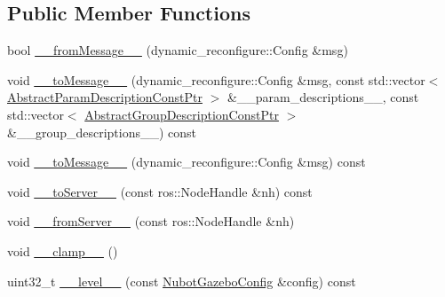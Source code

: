 \subsection*{Public Member Functions}
\begin{DoxyCompactItemize}
\item 
bool \hyperlink{classnubot__gazebo_1_1NubotGazeboConfig_a6c9c83ece7b76c7d538df8dc5e69c62c}{\-\_\-\-\_\-from\-Message\-\_\-\-\_\-} (dynamic\-\_\-reconfigure\-::\-Config \&msg)
\item 
void \hyperlink{classnubot__gazebo_1_1NubotGazeboConfig_a25e1ce21de33a87712288030cf048091}{\-\_\-\-\_\-to\-Message\-\_\-\-\_\-} (dynamic\-\_\-reconfigure\-::\-Config \&msg, const std\-::vector$<$ \hyperlink{classnubot__gazebo_1_1NubotGazeboConfig_a25b01b079fefa04f8d43df7d664dedac}{Abstract\-Param\-Description\-Const\-Ptr} $>$ \&\-\_\-\-\_\-param\-\_\-descriptions\-\_\-\-\_\-, const std\-::vector$<$ \hyperlink{classnubot__gazebo_1_1NubotGazeboConfig_aad0e4fda22f4c6a048f65a3de2f94c95}{Abstract\-Group\-Description\-Const\-Ptr} $>$ \&\-\_\-\-\_\-group\-\_\-descriptions\-\_\-\-\_\-) const 
\item 
void \hyperlink{classnubot__gazebo_1_1NubotGazeboConfig_adb45bfdcc3d7d644a9937faf061d75e9}{\-\_\-\-\_\-to\-Message\-\_\-\-\_\-} (dynamic\-\_\-reconfigure\-::\-Config \&msg) const 
\item 
void \hyperlink{classnubot__gazebo_1_1NubotGazeboConfig_a9ff712973fc5245ee2e128642aec736b}{\-\_\-\-\_\-to\-Server\-\_\-\-\_\-} (const ros\-::\-Node\-Handle \&nh) const 
\item 
void \hyperlink{classnubot__gazebo_1_1NubotGazeboConfig_a9ed025313605643c8ca483f6e522ad7c}{\-\_\-\-\_\-from\-Server\-\_\-\-\_\-} (const ros\-::\-Node\-Handle \&nh)
\item 
void \hyperlink{classnubot__gazebo_1_1NubotGazeboConfig_a4e3cd7a6dd5b1e1c4a287d61d97c5402}{\-\_\-\-\_\-clamp\-\_\-\-\_\-} ()
\item 
uint32\-\_\-t \hyperlink{classnubot__gazebo_1_1NubotGazeboConfig_a633f9c5e9d3ffbbfbe3f86450b86d322}{\-\_\-\-\_\-level\-\_\-\-\_\-} (const \hyperlink{classnubot__gazebo_1_1NubotGazeboConfig}{Nubot\-Gazebo\-Config} \&config) const 
\end{DoxyCompactItemize}

